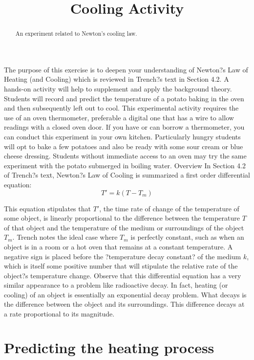 \documentclass{ximera}
\title{Cooling Activity}
\begin{document}
\begin{abstract}
An experiment related to Newton's cooling law.
\end{abstract}

\maketitle

The purpose of this exercise is to deepen your understanding of Newton?s Law of Heating (and Cooling) which is reviewed in Trench?s text in Section 4.2.  A hands-on activity will help to supplement and apply the background theory.  Students will record and predict the temperature of a potato baking in the oven and then subsequently left out to cool.  This experimental activity requires the use of an oven thermometer, preferable a digital one that has a wire to allow readings with a closed oven door.  If you have or can borrow a thermometer, you can conduct this experiment in your own kitchen.  Particularly hungry students will opt to bake a few potatoes and also be ready with some sour cream or blue cheese dressing.  Students without immediate access to an oven may try the same experiment with the potato submerged in boiling water.
Overview
In Section 4.2 of Trench?s text, Newton?s Law of Cooling is summarized a first order differential equation:
\[
T'=k(T-T_m)
\]

This equation stipulates that $T'$, the time rate of change of the temperature of some object, is linearly proportional to the difference between the temperature  $T$ of that object and the temperature of the medium or surroundings of the object $T_m$.  Trench notes the ideal case where  $T_m$ is perfectly constant, such as when an object is in a room or a hot oven that remains at a constant temperature.  A negative sign is placed before the ?temperature decay constant? of the medium $k$, which is itself some positive number that will stipulate the relative rate of the object?s temperature change.  Observe that this differential equation has a very similar appearance to a problem like radioactive decay.  In fact, heating (or cooling) of an object is essentially an exponential decay problem.  What decays is the difference between the object and its surroundings.  This difference decays at a rate proportional to its magnitude.

\section*{Predicting the heating process}
\end{document}

